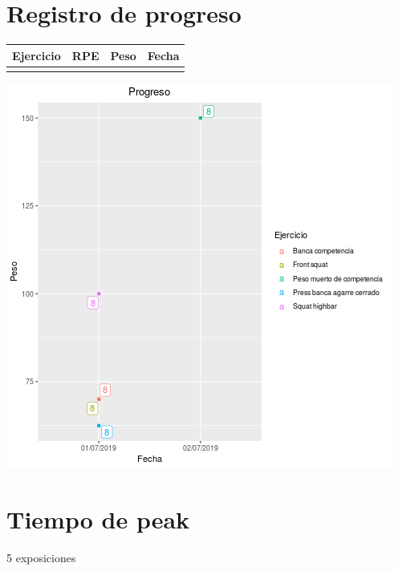 \documentclass[11pt]{article}
\begin{document}
\section{Registro de progreso}
\label{sec:orgb0b5249}
\begin{center}
\label{tab:org9c541b6}
\begin{tabular}{llll}
Ejercicio & RPE & Peso & Fecha\\
\hline
 &  &  & \\
\end{tabular}
\end{center}
\begin{center}
\includegraphics[width=.9\linewidth]{tmp.png}
\end{center}

\section{Tiempo de peak}
\label{sec:orgd953ccb}
5 exposiciones
\end{document}
